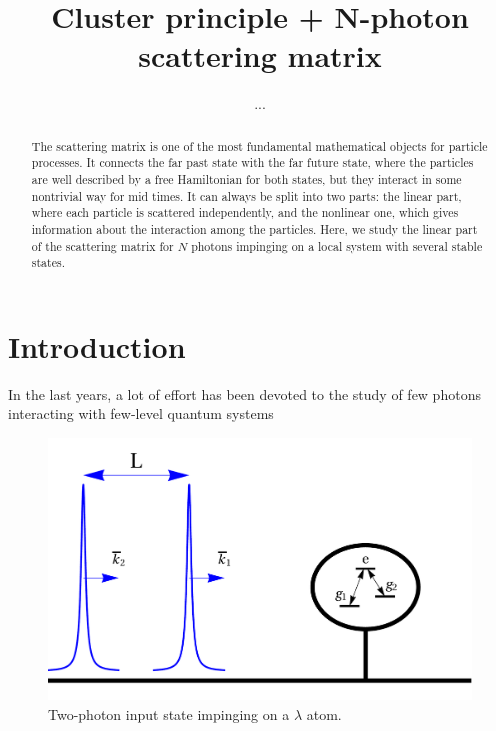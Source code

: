 \documentclass[aps,pra,reprint,amsmath,amssymb]{revtex4-1}
\begin{document}
\title{Cluster principle + N-photon scattering matrix}

\author{...}


\begin{abstract}
The scattering matrix is one of the most fundamental mathematical objects for particle processes. It connects the far past state with the far future state, where the particles are well described by a free Hamiltonian for both states, but they interact in some nontrivial way for mid times. It can always be split into two parts: the linear part, where each particle is scattered independently, and the nonlinear one, which gives information about the interaction among the particles. Here, we study the linear part of the scattering matrix for $N$ photons impinging on a local system with several stable states. 
\end{abstract}



\maketitle


\section{Introduction}

In the last years, a lot of effort has been devoted to the study of few photons interacting with few-level quantum systems \cite{fan10,Xu2015,Xu2016,Sanchez-Burillo2015,Sanchez-Burillo2016}

\begin{figure}
\includegraphics[scale=0.25]{input.pdf}
\caption{Two-photon input state impinging on a $\lambda$ atom.}
\end{figure}



\end{document}

